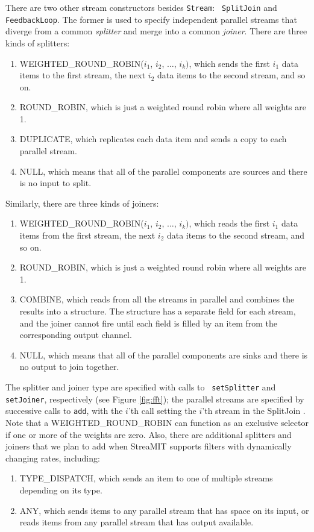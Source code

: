 There are two other stream constructors besides {\tt Stream}: {\tt
SplitJoin} and {\tt FeedbackLoop}.  The former is used to specify
independent parallel streams that diverge from a common {\it splitter}
and merge into a common {\it joiner}.  There are three kinds of
splitters:
\begin{enumerate}
\item WEIGHTED\_ROUND\_ROBIN($i_1$, $i_2$, $\dots$, $i_k)$,
which sends the first $i_1$ data items to the first stream, the next
$i_2$ data items to the second stream, and so on.
\item ROUND\_ROBIN, which is just a weighted round robin where all
weights are 1.
\item DUPLICATE, which replicates each data item and sends a copy to each
parallel stream.
\item NULL, which means that all of the parallel components are
sources and there is no input to split.
\end{enumerate}
Similarly, there are three kinds of joiners: 
\begin{enumerate}
\item WEIGHTED\_ROUND\_ROBIN($i_1$, $i_2$, $\dots$, $i_k)$, which reads the
first $i_1$ data items from the first stream, the next $i_2$ data
items to the second stream, and so on.
\item ROUND\_ROBIN, which is just a weighted round robin where all
weights are 1.
\item COMBINE, which reads from all the streams in parallel and combines the results into a structure.  The structure has a separate field for each stream, 
and the joiner cannot fire until each field is filled by an item from the 
corresponding output channel.
\item NULL, which means that all of the parallel components are sinks
and there is no output to join together.
\end{enumerate}
The splitter and joiner type are specified with calls to {\tt
setSplitter} and {\tt setJoiner}, respectively (see Figure
\ref{fig:fft}); the parallel streams are specified by successive calls
to {\tt add}, with the $i$'th call setting the $i$'th stream in the
SplitJoin .  Note that a WEIGHTED\_ROUND\_ROBIN can function as an
exclusive selector if one or more of the weights are zero.  Also,
there are additional splitters and joiners that we plan to add when
StreaMIT supports filters with dynamically changing rates, including:
\begin{enumerate}
\item TYPE\_DISPATCH, which sends an item to one of multiple streams
depending on its type.
\item ANY, which sends items to any parallel stream that has space on
its input, or reads items from any parallel stream that has output
available.
\end{enumerate}

